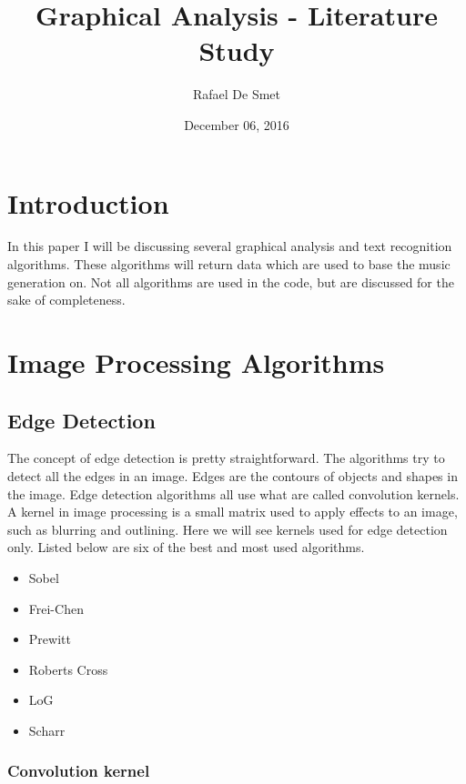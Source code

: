 \documentclass[12pt]{article}
\begin{document}
\title{Graphical Analysis - Literature Study}
\date{December 06, 2016}
\author{Rafael De Smet}

\maketitle
\tableofcontents
\newpage
\section{Introduction}

In this paper I will be discussing several graphical analysis and text recognition algorithms. These algorithms will return data which are used to base the music generation on. Not all algorithms are used in the code, but are discussed for the sake of completeness.

\section{Image Processing Algorithms}

\subsection{Edge Detection}

The concept of edge detection is pretty straightforward. The algorithms try to detect all the edges in an image. Edges are the contours of objects and shapes in the image.
Edge detection algorithms all use what are called convolution kernels. A kernel in image processing is a small matrix used to apply effects to an image, such as blurring and outlining. Here we will see kernels used for edge detection only. Listed below are six of the best and most used algorithms.

\begin{itemize}
        \item Sobel 
        \item Frei-Chen
        \item Prewitt
        \item Roberts Cross
        \item LoG
        \item Scharr
\end{itemize}

\subsubsection{Convolution kernel}
\end{document}
